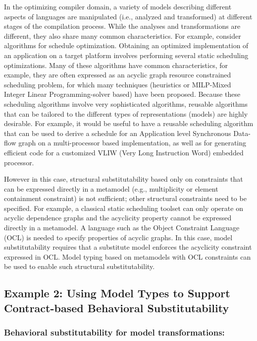 In the optimizing compiler domain, a variety of models describing different aspects of languages are manipulated (i.e., analyzed and transformed) at different stages of the compilation process. While the analyses and transformations are different, they also share many common characteristics.
For example, consider algorithms for schedule optimization. 
Obtaining an optimized implementation of an application on a target platform 
involves performing several static scheduling optimizations. 
Many of these algorithms have common characteristics, for example, they are often expressed as an acyclic graph resource constrained scheduling problem, for which many 
techniques (heuristics or MILP-Mixed Integer Linear Programming-solver based) have been proposed. 
Because these scheduling algorithms involve very sophisticated algorithms, reusable algorithms that can be tailored to the different types of representations (models) are highly desirable. 
For example, it would be useful to have a reusable scheduling algorithm that can be used to derive a schedule for an Application level Synchronous Data-flow graph on a multi-processor 
based implementation, as well as for generating efficient code for a customized VLIW (Very Long Instruction Word) embedded 
processor.        

However in this case, structural substitutability based only on constraints that can be expressed directly in a metamodel (e.g.,  multiplicity or element containment constraint) is not sufficient; other structural constraints need to be specified. 
For example, a classical static scheduling toolset can only operate on acyclic dependence graphs and the 
acyclicity property cannot be expressed directly in a metamodel. 
A language such as the Object Constraint Language (OCL) is needed to specify properties of acyclic graphs. 
In this case, model substitutability requires that a substitute model enforces the acyclicity constraint expressed in OCL.      
Model typing based on metamodels with OCL constraints can be used to enable such structural substitutability.

\subsection{Example 2: Using Model Types to Support Contract-based Behavioral Substitutability}\label{behavioralexample}

\subsubsection*{Behavioral substitutability for model transformations:}

